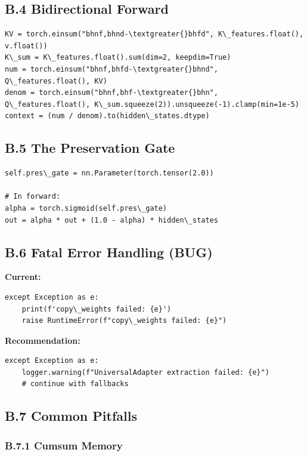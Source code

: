 \subsection{B.4 Bidirectional Forward}

\begin{lstlisting}
KV = torch.einsum("bhnf,bhnd-\textgreater{}bhfd", K\_features.float(), v.float())
K\_sum = K\_features.float().sum(dim=2, keepdim=True)
num = torch.einsum("bhnf,bhfd-\textgreater{}bhnd", Q\_features.float(), KV)
denom = torch.einsum("bhnf,bhf-\textgreater{}bhn", Q\_features.float(), K\_sum.squeeze(2)).unsqueeze(-1).clamp(min=1e-5)
context = (num / denom).to(hidden\_states.dtype)
\end{lstlisting}

\subsection{B.5 The Preservation Gate}

\begin{lstlisting}
self.pres\_gate = nn.Parameter(torch.tensor(2.0))

# In forward:
alpha = torch.sigmoid(self.pres\_gate)
out = alpha * out + (1.0 - alpha) * hidden\_states
\end{lstlisting}

\subsection{B.6 Fatal Error Handling (BUG)}

\textbf{Current:}
\begin{lstlisting}
except Exception as e:
    print(f'copy\_weights failed: {e}')
    raise RuntimeError(f"copy\_weights failed: {e}")
\end{lstlisting}

\textbf{Recommendation:}
\begin{lstlisting}
except Exception as e:
    logger.warning(f"UniversalAdapter extraction failed: {e}")
    # continue with fallbacks
\end{lstlisting}

\subsection{B.7 Common Pitfalls}

\subsubsection{B.7.1 Cumsum Memory}

